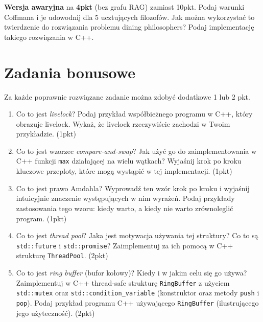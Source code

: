 \documentclass[12pt,a4paper]{article}
\begin{document}
	
	\textbf{Wersja awaryjna} na \textbf{4pkt} (bez grafu RAG) zamiast 10pkt. Podaj warunki Coffmana i je udowodnij dla 5 ucztujących filozofów. Jak można wykorzystać to twierdzenie do rozwiązania problemu dining philosophers? Podaj implementację takiego rozwiązania w C++.
	\section*{Zadania bonusowe}
	Za każde poprawnie rozwiązane zadanie można zdobyć dodatkowe 1 lub 2 pkt.
	
	\begin{enumerate}[label=\alph*)]
		\item Co to jest \emph{livelock}? Podaj przykład współbieżnego programu w C++, który obrazuje livelock. Wykaż, że livelock rzeczywiście zachodzi w Twoim przykładzie. (1pkt)
		
		\item Co to jest wzorzec \emph{compare-and-swap}? Jak użyć go do zaimplementowania w C++ funkcji \texttt{max} działającej na wielu wątkach? Wyjaśnij krok po kroku kluczowe przeploty, które mogą wystąpić w tej implementacji. (1pkt)
		
		\item Co to jest prawo Amdahla? Wyprowadź ten wzór krok po kroku i wyjaśnij intuicyjnie znaczenie występujących w nim wyrażeń. Podaj przykłady zastosowania tego wzoru: kiedy warto, a kiedy nie warto zrównoleglić program. (1pkt)
		
		\item Co to jest \emph{thread pool}? Jaka jest motywacja używania tej struktury? Co to są \texttt{std::future} i \texttt{std::promise}? Zaimplementuj za ich pomocą w C++ strukturę \texttt{ThreadPool}. (2pkt)
		
		\item Co to jest \emph{ring buffer} (bufor kołowy)? Kiedy i w jakim celu się go używa? Zaimplementuj w C++ thread-safe strukturę \texttt{RingBuffer} z użyciem \texttt{std::mutex} oraz \texttt{std::condition\_variable} (konstruktor oraz metody \texttt{push} i \texttt{pop}). Podaj przykład programu C++ używającego \texttt{RingBuffer} (ilustrującego jego użyteczność). (2pkt)
	\end{enumerate}
	
\end{document}
